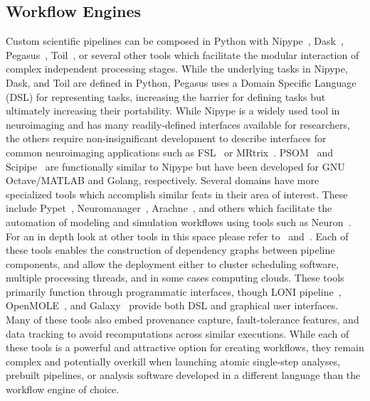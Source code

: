 \documentclass[fleqn,12pt]{SelfArx_ch} %
\begin{document}
\subsection{Workflow Engines}
Custom scientific pipelines can be composed in Python with Nipype~\cite{Gorgolewski2011-pq},
Dask~\cite{Rocklin2015-na}, Pegasus~\cite{Deelman2015-ui}, Toil~\cite{Vivian2017-ul}, or several other tools which
facilitate the modular interaction of complex independent processing stages. While the underlying tasks in Nipype,
Dask, and Toil are defined in Python, Pegasus uses a Domain Specific Language (DSL) for representing tasks, increasing
the barrier for defining tasks but ultimately increasing their portability. While Nipype is a widely used tool in
neuroimaging and has many readily-defined interfaces available for researchers, the others require non-insignificant
development to describe interfaces for common neuroimaging applications such as FSL~\cite{Jenkinson2012-ly} or
MRtrix~\cite{Tournier2012-po}. PSOM~\cite{Bellec2012-um} and Scipipe~\cite{Lampa2018-xn} are functionally similar to
Nipype but have been developed for GNU Octave/MATLAB and Golang, respectively. Several domains have more specialized
tools which accomplish similar feats in their area of interest. These include Pypet~\cite{Meyer2016-zt},
Neuromanager~\cite{Stockton2015-ex}, Arachne~\cite{Aleksin2017-ms}, and others which facilitate the automation of
modeling and simulation workflows using tools such as Neuron~\cite{Hines2001-wo}. For an in depth look at other tools
in this space please refer to~\cite{Meyer2016-zt} and~\cite{Stockton2015-ex}. Each of these tools enables the
construction of dependency graphs between pipeline components, and allow the deployment either to cluster scheduling
software, multiple processing threads, and in some cases computing clouds. These tools primarily function through
programmatic interfaces, though LONI pipeline~\cite{Rex2003-pr}, OpenMOLE~\cite{Reuillon2013-zo}, and
Galaxy~\cite{Goecks2010-cl} provide both DSL and graphical user interfaces. Many of these tools also embed provenance
capture, fault-tolerance features, and data tracking to avoid recomputations across similar executions. While each of
these tools is a powerful and attractive option for creating workflows, they remain complex and potentially overkill
when launching atomic single-step analyses, prebuilt pipelines, or analysis software developed in a different language
than the workflow engine of choice.
\end{document}
